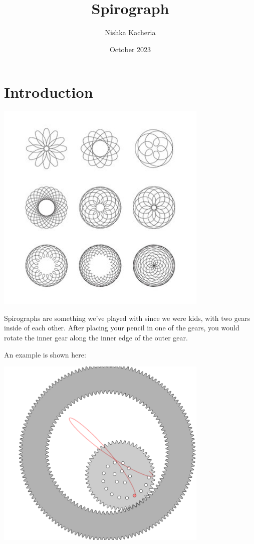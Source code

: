 \documentclass{article}
\title{Spirograph}
\author{Nishka Kacheria}
\date{October 2023}
\begin{document}
\maketitle

\section{Introduction}
\begin{center}
\includegraphics[width=4in]{images/Spirograph Examples.jpg}
\end{center}

Spirographs are something we've played with since we were kids, with two gears inside of each other. After placing your pencil in one of the gears, you would rotate the inner gear along the inner edge of the outer gear.

An example is shown here:

\begin{center}
\includegraphics[width=4in]{images/Spirograph Example.png}
\end{center}
\end{document}
